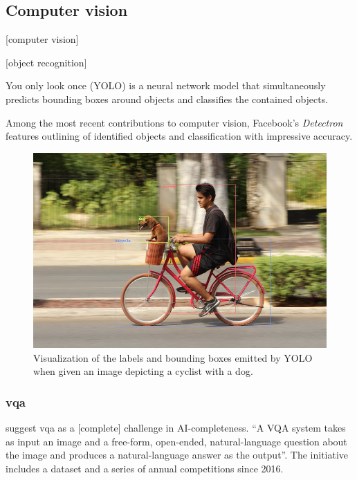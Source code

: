 


\subsection{Computer vision}

[computer vision]

[object recognition]

You only look once (YOLO) \citep{RedmonYouOnlyLook2015} is a neural network model that simultaneously predicts bounding boxes around objects and classifies the contained objects.

Among the most recent contributions to computer vision, Facebook's \textit{Detectron} \citep{Detectron2018} features outlining of identified objects and classification with impressive accuracy.

\begin{figure}[h]
\label{fig:dogbike_annotated}
\includegraphics[width=\textwidth]{dogbike_annotated}
\centering
\caption{Visualization of the labels and bounding boxes emitted by YOLO when given an image depicting a cyclist with a dog.}
\end{figure}



\subsubsection{\Acrfull{vqa}}

\cite{AgrawalVQAVisualQuestion2015} suggest \acrfull{vqa} as a [complete] challenge in AI-completeness.
``A VQA system takes as input an image and a free-form, open-ended, natural-language question about the image and produces a natural-language answer as the output''.
The initiative includes a dataset and a series of annual competitions since 2016.

\cite{AndreasLearningComposeNeural2016}